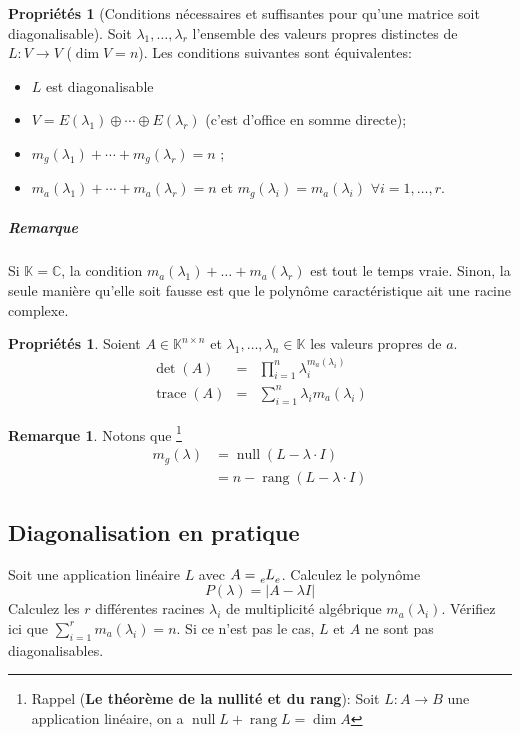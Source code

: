 \documentclass[11pt,a4paper]{article}
\theoremstyle{definition}
\newtheorem{myprop}[mydef]{Propriétés}
\newtheorem{myrem}[mydef]{Remarque}
\DeclareMathOperator{\trace}{trace}
\DeclareMathOperator{\newdim}{dim}
\DeclareMathOperator{\newrang}{rang}
\DeclareMathOperator{\newnull}{null}
\newcommand{\C}{\mathbb{C}}
\newcommand{\K}{\mathbb{K}}
\newcommand{\Knn}{\K^{n \times n}}
\begin{document}
\begin{myprop}[Conditions nécessaires et suffisantes pour qu'une matrice soit diagonalisable]
	Soit $\lambda_1 , \dots , \lambda_r$ l'ensemble des valeurs propres distinctes de $L : V \rightarrow V$ ($\newdim V = n$).
	Les conditions suivantes sont équivalentes:
	\begin{itemize}
		\item $L$ est diagonalisable
		\item $V = E(\lambda_1) \oplus \cdots \oplus E(\lambda_r)$ (c'est d'office en somme directe);
		\item $m_g(\lambda_1) + \cdots + m_g(\lambda_r) = n$ ;
		\item $m_a (\lambda_1) + \cdots + m_a (\lambda_r) = n$ et $m_g(\lambda_i) = m_a (\lambda_i)$ $\forall i = 1, \dots, r$.
	\end{itemize}
	\subparagraph{Remarque}
	Si $\K = \C$, la condition $m_a(\lambda_1) + \dots + m_a(\lambda_r)$ est tout le temps vraie.
	Sinon, la seule manière qu'elle soit fausse est que le polynôme caractéristique ait une racine complexe.
\end{myprop}

\begin{myprop}
	Soient $A \in \Knn$ et $\lambda_1, \dots, \lambda_n \in \K$ les valeurs propres de $a$.
	\begin{eqnarray*}
		\det(A) &=& \prod_{i = 1}^{n} \lambda_i^{m_a(\lambda_i)}\\
		\trace(A) &=& \sum_{i = 1}^{n} \lambda_i m_a(\lambda_i)
	\end{eqnarray*}
\end{myprop}

\begin{myrem}
	Notons que
	\footnote{Rappel ({\bf Le théorème de la nullité et du rang}):
	Soit $L:A \to B$ une application linéaire, on a $\newnull L + \newrang L = \dim A$}
	\begin{align*}
		m_g(\lambda) & = \newnull (L - \lambda \cdot I) \\
		& = n - \newrang (L - \lambda \cdot I)
	\end{align*}
\end{myrem}

\subsection{Diagonalisation en pratique}
Soit une application linéaire $L$ avec $A = \tensor*[_e]{L}{_e}$.
Calculez le polynôme
\[ P(\lambda) = \left| A - \lambda I \right| \]
Calculez les $r$ différentes racines $\lambda_i$ de multiplicité algébrique $m_a(\lambda_i)$.
Vérifiez ici que $\sum_{i=1}^r m_a(\lambda_i) = n$. Si ce n'est pas le cas, $L$ et $A$ ne sont pas diagonalisables.
\end{document}
